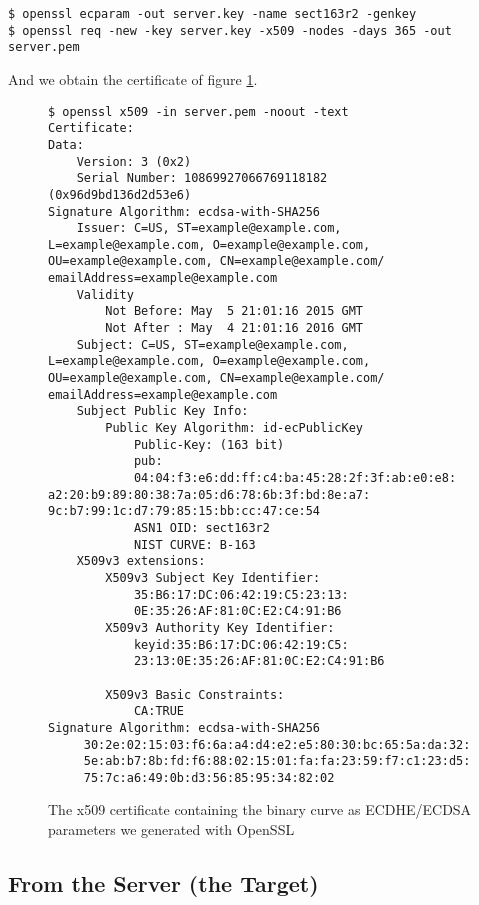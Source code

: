 \documentclass[a4paper,11pt]{article}
\begin{document}
\begin{verbatim}
$ openssl ecparam -out server.key -name sect163r2 -genkey
$ openssl req -new -key server.key -x509 -nodes -days 365 -out server.pem
\end{verbatim}

And we obtain the certificate of figure 
\ref{fig:cert}.

\begin{figure}[H]
\begin{verbatim}
$ openssl x509 -in server.pem -noout -text
Certificate:
Data:
    Version: 3 (0x2)
    Serial Number: 10869927066769118182 (0x96d9bd136d2d53e6)
Signature Algorithm: ecdsa-with-SHA256
    Issuer: C=US, ST=example@example.com, L=example@example.com, O=example@example.com, OU=example@example.com, CN=example@example.com/ emailAddress=example@example.com
    Validity
        Not Before: May  5 21:01:16 2015 GMT
        Not After : May  4 21:01:16 2016 GMT
    Subject: C=US, ST=example@example.com, L=example@example.com, O=example@example.com, OU=example@example.com, CN=example@example.com/ emailAddress=example@example.com
    Subject Public Key Info:
        Public Key Algorithm: id-ecPublicKey
            Public-Key: (163 bit)
            pub: 
            04:04:f3:e6:dd:ff:c4:ba:45:28:2f:3f:ab:e0:e8:                                    a2:20:b9:89:80:38:7a:05:d6:78:6b:3f:bd:8e:a7:                                    9c:b7:99:1c:d7:79:85:15:bb:cc:47:ce:54
            ASN1 OID: sect163r2
            NIST CURVE: B-163
    X509v3 extensions:
        X509v3 Subject Key Identifier: 
            35:B6:17:DC:06:42:19:C5:23:13:
            0E:35:26:AF:81:0C:E2:C4:91:B6
        X509v3 Authority Key Identifier: 
            keyid:35:B6:17:DC:06:42:19:C5:
            23:13:0E:35:26:AF:81:0C:E2:C4:91:B6

        X509v3 Basic Constraints: 
            CA:TRUE
Signature Algorithm: ecdsa-with-SHA256
     30:2e:02:15:03:f6:6a:a4:d4:e2:e5:80:30:bc:65:5a:da:32:
     5e:ab:b7:8b:fd:f6:88:02:15:01:fa:fa:23:59:f7:c1:23:d5:
     75:7c:a6:49:0b:d3:56:85:95:34:82:02
\end{verbatim}
\caption{The x509 certificate containing the binary curve as ECDHE/ECDSA parameters we generated with OpenSSL}
\label{fig:cert}
\end{figure}

\subsection{From the Server (the Target)}
\end{document}
